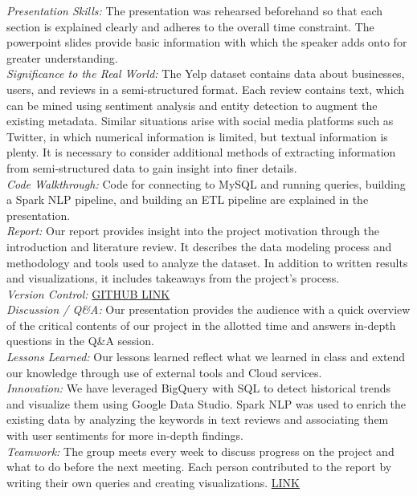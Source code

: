 \documentclass[11pt,journal,compsoc]{IEEEtran}
\begin{document}
\appendix
\textit{Presentation Skills:} The presentation was rehearsed beforehand so that each section is explained clearly and adheres to the overall time constraint. The powerpoint slides provide basic information with which the speaker adds onto for greater understanding. \\
\textit{Significance to the Real World:} The Yelp dataset contains data about businesses, users, and reviews in a semi-structured format. Each review contains text, which can be mined using sentiment analysis and entity detection to augment the existing metadata. Similar situations arise with social media platforms such as Twitter, in which numerical information is limited, but textual information is plenty. It is necessary to consider additional methods of extracting information from semi-structured data to gain insight into finer details. \\
\textit{Code Walkthrough:} Code for connecting to MySQL and running queries, building a Spark NLP pipeline, and building an ETL pipeline are explained in the presentation. \\
\textit{Report: }Our report provides insight into the project motivation through the introduction and literature review. It describes the data modeling process and methodology and tools used to analyze the dataset. In addition to written results and visualizations, it includes takeaways from the project’s process. \\
\textit{Version Control:} \href{https://github.com/groth00/Data225}{GITHUB LINK} \\
\textit{Discussion / Q\&A:} Our presentation provides the audience with a quick overview of the critical contents of our project in the allotted time and answers in-depth questions in the Q\&A session. \\
\textit{Lessons Learned:} Our lessons learned reflect what we learned in class and extend our knowledge through use of external tools and Cloud services. \\
\textit{Innovation:} We have leveraged BigQuery with SQL to detect historical trends and visualize them using Google Data Studio. Spark NLP was used to enrich the existing data by analyzing the keywords in text reviews and associating them with user sentiments for more in-depth findings. \\
\textit{Teamwork:} The group meets every week to discuss progress on the project and what to do before the next meeting. Each person contributed to the report by writing their own queries and creating visualizations. \href{https://docs.google.com/document/u/1/d/1hZlhFjr7_z8AbwafHHmYNUxNNnhF1n_-k4luKLoJTvQ/}{LINK} \\
\end{document}
